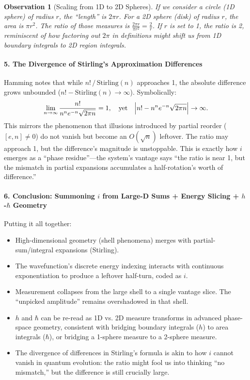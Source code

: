 \documentclass{article}
\newtheorem{observation}{Observation}
\begin{document}
\begin{observation}[Scaling from 1D to 2D Spheres]
If we consider a circle (1D sphere) of radius $r$, the “length” is $2\pi r$. For a 2D sphere (disk) of radius $r$, the area is $\pi r^2$. The ratio of those measures is $\frac{2\pi r}{\pi r^2} = \frac{2}{r}$. If $r$ is set to 1, the ratio is 2, reminiscent of how factoring out $2\pi$ in definitions might shift us from 1D boundary integrals to 2D region integrals.
\end{observation}

\paragraph{5. The Divergence of Stirling’s Approximation Differences}
Hamming notes that while $n!\,/\,\text{Stirling}(n)$ approaches 1, the absolute difference grows unbounded ($n! - \text{Stirling}(n)\to\infty$). Symbolically:
\begin{equation}
\lim_{n\to\infty}\frac{n!}{n^ne^{-n}\sqrt{2\pi n}} = 1,\quad\text{yet}\quad\Bigl| n! - n^ne^{-n}\sqrt{2\pi n}\Bigr|\to\infty.
\end{equation}
This mirrors the phenomenon that illusions introduced by partial reorder ($[e,n]\neq0$) do not vanish but become an $O(\sqrt{n})$ leftover. The ratio may approach 1, but the difference’s magnitude is unstoppable. This is exactly how $i$ emerges as a “phase residue”---the system’s vantage says “the ratio is near 1, but the mismatch in partial expansions accumulates a half-rotation’s worth of difference.”

\paragraph{6. Conclusion: Summoning $i$ from Large-D Sums + Energy Slicing + $h$-$\hbar$ Geometry}
Putting it all together:
\begin{itemize}
\item High-dimensional geometry (shell phenomena) merges with partial-sum/integral expansions (Stirling).\vspace{-4pt}
\item The wavefunction’s discrete energy indexing interacts with continuous exponentiation to produce a leftover half-turn, coded as $i$.\vspace{-4pt}
\item Measurement collapses from the large shell to a single vantage slice. The “unpicked amplitude” remains overshadowed in that shell.\vspace{-4pt}
\item $h$ and $\hbar$ can be re-read as 1D vs. 2D measure transforms in advanced phase-space geometry, consistent with bridging boundary integrals ($h$) to area integrals ($\hbar$), or bridging a 1-sphere measure to a 2-sphere measure.\vspace{-4pt}
\item The divergence of differences in Stirling’s formula is akin to how $i$ cannot vanish in quantum evolution: the ratio might fool us into thinking “no mismatch,” but the difference is still crucially large.
\end{itemize}
\end{document}
